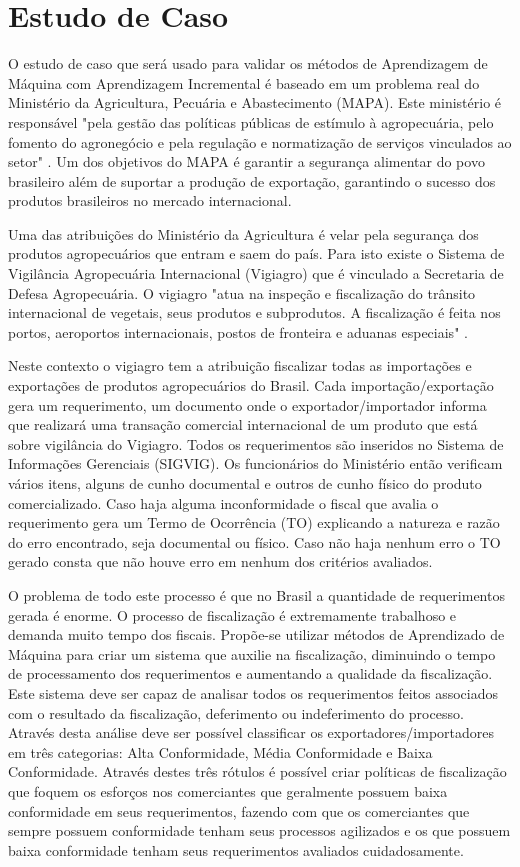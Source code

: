 \chapter{Estudo de Caso}
O estudo de caso que será usado para validar os métodos de Aprendizagem de Máquina com Aprendizagem Incremental é baseado em um problema real do Ministério da Agricultura, Pecuária e Abastecimento (MAPA). Este ministério é responsável  "pela gestão das políticas públicas de estímulo à agropecuária, pelo fomento do agronegócio e pela regulação e normatização de serviços vinculados ao setor" \cite{mapa}. Um dos objetivos do MAPA é garantir a segurança alimentar do povo brasileiro além de suportar a produção de exportação, garantindo o sucesso dos produtos brasileiros no mercado internacional.

Uma das atribuições do Ministério da Agricultura é velar pela segurança dos produtos agropecuários que entram e saem do país. Para isto existe o Sistema de Vigilância Agropecuária Internacional (Vigiagro) que é vinculado a Secretaria de Defesa Agropecuária. O vigiagro "atua na inspeção e fiscalização do trânsito internacional de vegetais, seus produtos e subprodutos. A fiscalização é feita nos portos, aeroportos internacionais, postos de fronteira e aduanas especiais" \cite{vigiagro}.

Neste contexto o vigiagro tem a atribuição fiscalizar todas as importações e exportações de produtos agropecuários do Brasil. Cada importação/exportação gera um requerimento, um documento onde o exportador/importador informa que realizará uma transação comercial internacional de um produto que está sobre vigilância do Vigiagro. Todos os requerimentos são inseridos no Sistema de Informações Gerenciais (SIGVIG). Os funcionários do Ministério então verificam vários itens, alguns de cunho documental e outros de cunho físico do produto comercializado. Caso haja alguma inconformidade o fiscal que avalia o requerimento gera um Termo de Ocorrência (TO) explicando a natureza e razão do erro encontrado, seja documental ou físico. Caso não haja nenhum erro o TO gerado consta que não houve erro em nenhum dos critérios avaliados.

O problema de todo este processo é que no Brasil a quantidade de requerimentos gerada é enorme. O processo de fiscalização é extremamente trabalhoso e demanda muito tempo dos fiscais. Propõe-se utilizar métodos de Aprendizado de Máquina para criar um sistema que auxilie na fiscalização, diminuindo o tempo de processamento dos requerimentos e aumentando a qualidade da fiscalização. Este sistema deve ser capaz de analisar todos os requerimentos feitos associados com o resultado da fiscalização, deferimento ou indeferimento do processo. Através desta análise deve ser possível classificar os exportadores/importadores em três categorias: Alta Conformidade, Média Conformidade e Baixa Conformidade. Através destes três rótulos é possível criar políticas de fiscalização que foquem os esforços nos comerciantes que geralmente possuem baixa conformidade em seus requerimentos, fazendo com que os comerciantes que sempre possuem conformidade tenham seus processos agilizados e os que possuem baixa conformidade tenham seus requerimentos avaliados cuidadosamente. 

